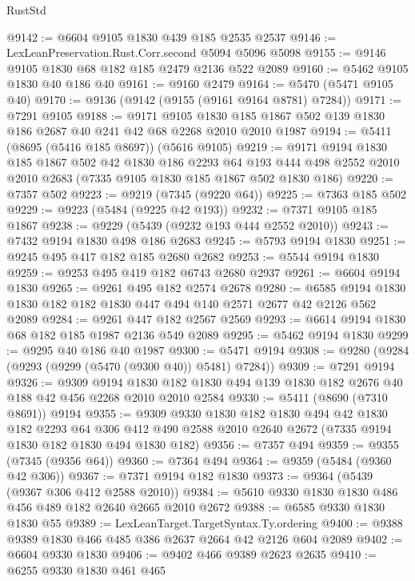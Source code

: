 \begin{lexlean}{RustStd}
\begin{coremodule}
@9142 := @6604 @9105 @1830 @439 @185 @2535 @2537
@9146 := LexLeanPreservation.Rust.Corr.second @5094 @5096 @5098
@9155 := @9146 @9105 @1830 @68 @182 @185 @2479 @2136 @522 @2089
@9160 := @5462 @9105 @1830 @40 @186 @40
@9161 := @9160 @2479
@9164 := @5470 (@5471 @9105 @40)
@9170 := @9136 (@9142 (@9155 (@9161 @9164 @8781) @7284))
@9171 := @7291 @9105
@9188 := @9171
    @9105
    @1830
    @185
    @1867
    @502
    @139
    @1830
    @186
    @2687
    @40
    @241
    @42
    @68
    @2268
    @2010
    @2010
    @1987
@9194 := @5411 (@8695 (@5416 @185 @8697)) (@5616 @9105)
@9219 := @9171
    @9194
    @1830
    @185
    @1867
    @502
    @42
    @1830
    @186
    @2293
    @64
    @193
    @444
    @498
    @2552
    @2010
    @2010
    @2683
    (@7335 @9105 @1830 @185 @1867 @502 @1830 @186)
@9220 := @7357 @502
@9223 := @9219 (@7345 (@9220 @64))
@9225 := @7363 @185 @502
@9229 := @9223 (@5484 (@9225 @42 @193))
@9232 := @7371 @9105 @185 @1867
@9238 := @9229 (@5439 (@9232 @193 @444 @2552 @2010))
@9243 := @7432 @9194 @1830 @498 @186 @2683
@9245 := @5793 @9194 @1830
@9251 := @9245 @495 @417 @182 @185 @2680 @2682
@9253 := @5544 @9194 @1830
@9259 := @9253 @495 @419 @182 @6743 @2680 @2937
@9261 := @6604 @9194 @1830
@9265 := @9261 @495 @182 @2574 @2678
@9280 := @6585 @9194 @1830 @1830 @182 @182 @1830 @447 @494 @140 @2571 @2677 @42 @2126 @562 @2089
@9284 := @9261 @447 @182 @2567 @2569
@9293 := @6614 @9194 @1830 @68 @182 @185 @1987 @2136 @549 @2089
@9295 := @5462 @9194 @1830
@9299 := @9295 @40 @186 @40 @1987
@9300 := @5471 @9194
@9308 := @9280 (@9284 (@9293 (@9299 (@5470 (@9300 @40)) @5481) @7284))
@9309 := @7291 @9194
@9326 := @9309
    @9194
    @1830
    @182
    @1830
    @494
    @139
    @1830
    @182
    @2676
    @40
    @188
    @42
    @456
    @2268
    @2010
    @2010
    @2584
@9330 := @5411 (@8690 (@7310 @8691)) @9194
@9355 := @9309
    @9330
    @1830
    @182
    @1830
    @494
    @42
    @1830
    @182
    @2293
    @64
    @306
    @412
    @490
    @2588
    @2010
    @2640
    @2672
    (@7335 @9194 @1830 @182 @1830 @494 @1830 @182)
@9356 := @7357 @494
@9359 := @9355 (@7345 (@9356 @64))
@9360 := @7364 @494
@9364 := @9359 (@5484 (@9360 @42 @306))
@9367 := @7371 @9194 @182 @1830
@9373 := @9364 (@5439 (@9367 @306 @412 @2588 @2010))
@9384 := @5610 @9330 @1830 @1830 @486 @456 @489 @182 @2640 @2665 @2010 @2672
@9388 := @6585 @9330 @1830 @1830 @55
@9389 := LexLeanTarget.TargetSyntax.Ty.ordering
@9400 := @9388 @9389 @1830 @466 @485 @386 @2637 @2664 @42 @2126 @604 @2089
@9402 := @6604 @9330 @1830
@9406 := @9402 @466 @9389 @2623 @2635
@9410 := @6255 @9330 @1830 @461 @465

\end{coremodule}
\end{lexlean}
